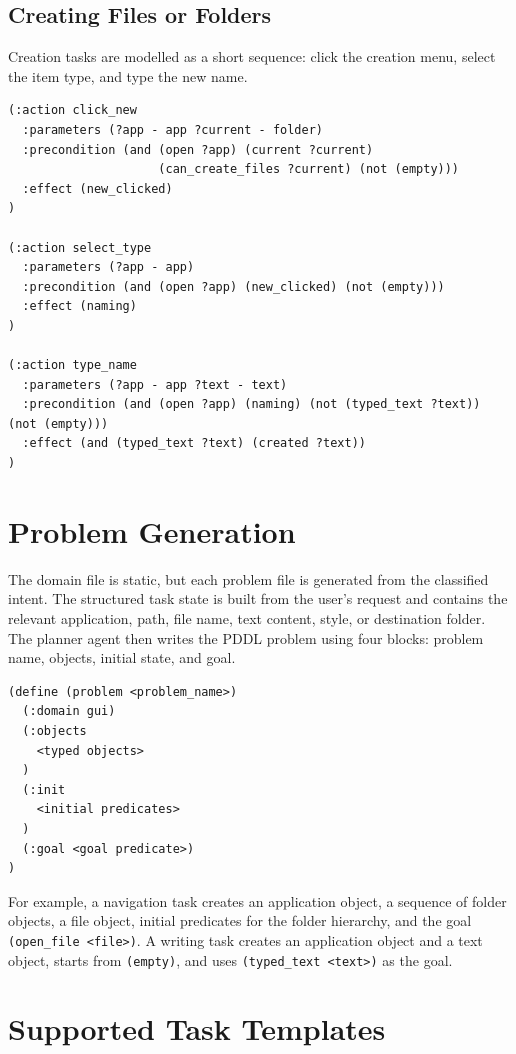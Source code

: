 \subsection{Creating Files or Folders}

Creation tasks are modelled as a short sequence: click the creation menu, select the item type, and type the new name.

\begin{lstlisting}
(:action click_new
  :parameters (?app - app ?current - folder)
  :precondition (and (open ?app) (current ?current)
                     (can_create_files ?current) (not (empty)))
  :effect (new_clicked)
)

(:action select_type
  :parameters (?app - app)
  :precondition (and (open ?app) (new_clicked) (not (empty)))
  :effect (naming)
)

(:action type_name
  :parameters (?app - app ?text - text)
  :precondition (and (open ?app) (naming) (not (typed_text ?text)) (not (empty)))
  :effect (and (typed_text ?text) (created ?text))
)
\end{lstlisting}

\section{Problem Generation}

The domain file is static, but each problem file is generated from the classified intent. The structured task state is built from the user's request and contains the relevant application, path, file name, text content, style, or destination folder. The planner agent then writes the PDDL problem using four blocks: problem name, objects, initial state, and goal.

\begin{lstlisting}
(define (problem <problem_name>)
  (:domain gui)
  (:objects
    <typed objects>
  )
  (:init
    <initial predicates>
  )
  (:goal <goal predicate>)
)
\end{lstlisting}

For example, a navigation task creates an application object, a sequence of folder objects, a file object, initial predicates for the folder hierarchy, and the goal \texttt{(open\_file <file>)}. A writing task creates an application object and a text object, starts from \texttt{(empty)}, and uses \texttt{(typed\_text <text>)} as the goal.

\section{Supported Task Templates}

